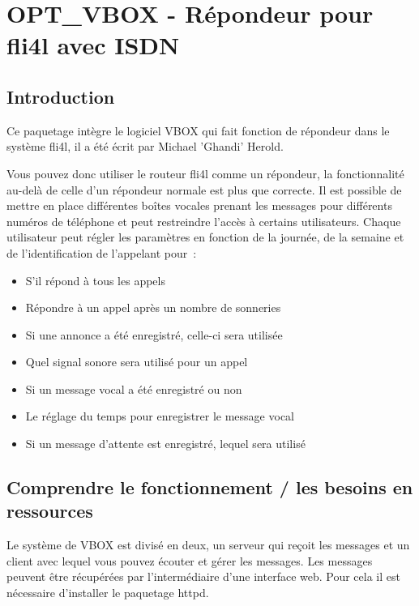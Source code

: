 {
\section {OPT\_VBOX - Répondeur pour fli4l avec ISDN}
}

\subsection{Introduction}

Ce paquetage intègre le logiciel VBOX qui fait fonction de répondeur dans le système
fli4l, il a été écrit par Michael ’Ghandi’ Herold.

Vous pouvez donc utiliser le routeur fli4l comme un répondeur, la fonctionnalité
au-delà de celle d'un répondeur normale est plus que correcte. Il est possible de mettre
en place différentes boîtes vocales prenant les messages pour différents numéros de
téléphone et peut restreindre l'accès à certains utilisateurs. Chaque utilisateur peut
régler les paramètres en fonction de la journée, de la semaine et de l'identification
de l'appelant pour~:

\begin{itemize}
    \item S'il répond à tous les appels
    \item Répondre à un appel après un nombre de sonneries
    \item Si une annonce a été enregistré, celle-ci sera utilisée
    \item Quel signal sonore sera utilisé pour un appel
    \item Si un message vocal a été enregistré ou non
    \item Le réglage du temps pour enregistrer le message vocal
    \item Si un message d'attente est enregistré, lequel sera utilisé
\end{itemize}

\subsection{Comprendre le fonctionnement / les besoins en ressources}

Le système de VBOX est divisé en deux, un serveur qui reçoit les messages et un client
avec lequel vous pouvez écouter et gérer les messages. Les messages peuvent être
récupérées par l'intermédiaire d'une interface web. Pour cela il est nécessaire
d'installer le paquetage httpd.

